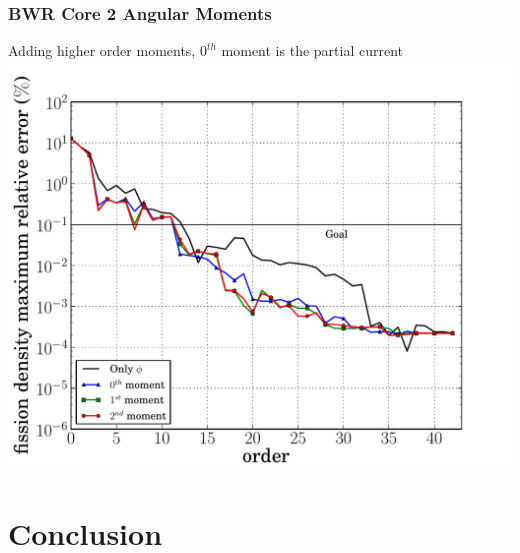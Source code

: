 \documentclass[fleqn]{beamer}
\begin{document}
  \begin{frame}
    \frametitle{BWR Core 2 Angular Moments}
    \begin{center}
    Adding higher order moments, $0^{th}$ moment is the partial current
    \includegraphics[trim=.1cm .25cm 2.0cm .4cm, clip=true, totalheight=.8\textheight]{BWR2_44_angular_comparison_fission_core-44}
    \end{center}
  \end{frame}

  \section{Conclusion}
\end{document}
